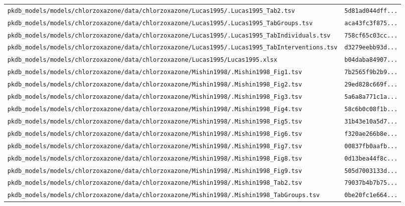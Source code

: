 \documentclass{article}
\begin{document}
\begin{longtable}{ll}
\texttt{pkdb\_models/models/chlorzoxazone/data/chlorzoxazone/Lucas1995/.Lucas1995\_Tab2.tsv} & \texttt{5d81ad044dff...} \\
\texttt{pkdb\_models/models/chlorzoxazone/data/chlorzoxazone/Lucas1995/.Lucas1995\_TabGroups.tsv} & \texttt{aca43fc3f875...} \\
\texttt{pkdb\_models/models/chlorzoxazone/data/chlorzoxazone/Lucas1995/.Lucas1995\_TabIndividuals.tsv} & \texttt{758cf65c03cc...} \\
\texttt{pkdb\_models/models/chlorzoxazone/data/chlorzoxazone/Lucas1995/.Lucas1995\_TabInterventions.tsv} & \texttt{d3279eebb93d...} \\
\texttt{pkdb\_models/models/chlorzoxazone/data/chlorzoxazone/Lucas1995/Lucas1995.xlsx} & \texttt{b04daba84907...} \\
\texttt{pkdb\_models/models/chlorzoxazone/data/chlorzoxazone/Mishin1998/.Mishin1998\_Fig1.tsv} & \texttt{7b2565f9b2b9...} \\
\texttt{pkdb\_models/models/chlorzoxazone/data/chlorzoxazone/Mishin1998/.Mishin1998\_Fig2.tsv} & \texttt{29ed828c669f...} \\
\texttt{pkdb\_models/models/chlorzoxazone/data/chlorzoxazone/Mishin1998/.Mishin1998\_Fig3.tsv} & \texttt{5a6a8a771c1a...} \\
\texttt{pkdb\_models/models/chlorzoxazone/data/chlorzoxazone/Mishin1998/.Mishin1998\_Fig4.tsv} & \texttt{58c6b0c08f1b...} \\
\texttt{pkdb\_models/models/chlorzoxazone/data/chlorzoxazone/Mishin1998/.Mishin1998\_Fig5.tsv} & \texttt{31b43e10a5d7...} \\
\texttt{pkdb\_models/models/chlorzoxazone/data/chlorzoxazone/Mishin1998/.Mishin1998\_Fig6.tsv} & \texttt{f320ae266b8e...} \\
\texttt{pkdb\_models/models/chlorzoxazone/data/chlorzoxazone/Mishin1998/.Mishin1998\_Fig7.tsv} & \texttt{00837fb0aafb...} \\
\texttt{pkdb\_models/models/chlorzoxazone/data/chlorzoxazone/Mishin1998/.Mishin1998\_Fig8.tsv} & \texttt{0d13bea44f8c...} \\
\texttt{pkdb\_models/models/chlorzoxazone/data/chlorzoxazone/Mishin1998/.Mishin1998\_Fig9.tsv} & \texttt{505d7003133d...} \\
\texttt{pkdb\_models/models/chlorzoxazone/data/chlorzoxazone/Mishin1998/.Mishin1998\_Tab2.tsv} & \texttt{79037b4b7b75...} \\
\texttt{pkdb\_models/models/chlorzoxazone/data/chlorzoxazone/Mishin1998/.Mishin1998\_TabGroups.tsv} & \texttt{0be20fc1e664...} \\

\end{longtable}
\end{document}
